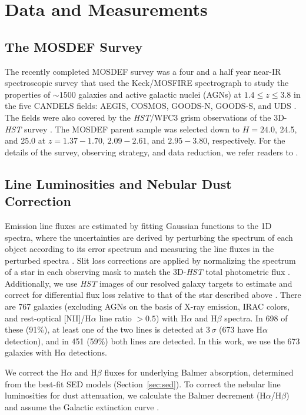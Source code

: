 \documentclass[iop]{emulateapj}
\newcommand{\halpha}{H\ensuremath{\alpha}}
\newcommand{\hbeta}{H\ensuremath{\beta}}
\begin{document}
\section{Data and Measurements}
\label{sec:data}

\subsection{The MOSDEF Survey}
\label{mosdef}
The recently completed MOSDEF survey was a four and a half year near-IR spectroscopic survey that used the Keck/MOSFIRE spectrograph \citep{mclean12} to study the properties of $\sim 1500$ galaxies and active galactic nuclei (AGNs) at $1.4\leq z\leq 3.8$ in the five CANDELS fields: AEGIS, COSMOS, GOODS-N, GOODS-S, and UDS \citep{grogin11,koekemoer11}. The fields were also covered by the {\em HST}/WFC3 grism observations of the 3D-{\em HST} survey \citep{skelton14,momcheva16}. The MOSDEF parent sample was selected down to $H=24.0$, 24.5, and 25.0 at $z=1.37-1.70$, $2.09-2.61$, and $2.95-3.80$, respectively. 
For the details of the survey, observing strategy, and data reduction, we refer readers to \citet{kriek15}.

\subsection{Line Luminosities and Nebular Dust Correction}
\label{line_lum}
Emission line fluxes are estimated by fitting Gaussian functions to the 1D spectra, where the uncertainties are derived by perturbing the spectrum of each object according to its error spectrum and measuring the line fluxes in the perturbed spectra \citep{kriek15,reddy15}. Slit loss corrections are applied by normalizing the spectrum of a star in each observing mask to match the 3D-{\em HST} total photometric flux \citep{skelton14}. 
Additionally, we use {\em HST} images of our resolved galaxy targets to estimate and correct for differential flux loss relative to that of the star described above \citep{kriek15}. 
There are 767 galaxies (excluding AGNs on the basis of X-ray emission, IRAC colors, and rest-optical [N{\sc II}]/{\halpha} line ratio $>0.5$) with {\halpha} and {\hbeta} spectra. In 698 of these (91\%), at least one of the two lines is detected at 3\,$\sigma$ (673 have {\halpha} detection), and in 451 (59\%) both lines are detected. In this work, we use the 673 galaxies with {\halpha} detections.

We correct the H$\alpha$ and H$\beta$ fluxes for underlying Balmer absorption, determined from the best-fit SED models (Section~\ref{sec:sed}). 
To correct the nebular line luminosities for dust attenuation, we calculate the Balmer decrement ({\halpha}/{\hbeta}) and assume the \citet{cardelli89} Galactic extinction curve \citep{reddy15,shivaei15b,shivaei16}. 
\end{document}
